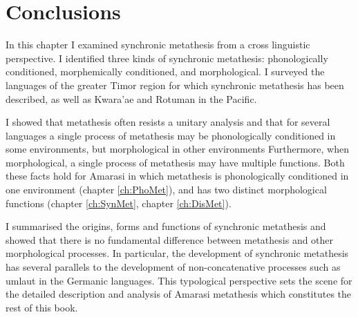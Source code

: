\section{Conclusions}\label{sec:MorMetCon}
In this chapter I examined synchronic metathesis from
a cross linguistic perspective.
I identified three kinds of synchronic metathesis:
phonologically conditioned, morphemically conditioned, and morphological.
I surveyed the languages of the greater Timor region
for which synchronic metathesis has been described,
as well as Kwara'ae and Rotuman in the Pacific.

I showed that metathesis often resists a unitary analysis
and that for several languages a single process of metathesis may be phonologically conditioned
in some environments, but morphological in other environments
Furthermore, when morphological, a single process of metathesis may have multiple functions.
Both these facts hold for Amarasi in which metathesis is
phonologically conditioned in one environment (chapter \ref{ch:PhoMet}),
and has two distinct morphological functions (chapter \ref{ch:SynMet}, chapter \ref{ch:DisMet}).

I summarised the origins, forms and functions of synchronic metathesis
and showed that there is no fundamental difference between metathesis
and other morphological processes.
In particular, the development of synchronic metathesis has
several parallels to the development of non-concatenative
processes such as umlaut in the Germanic languages.
This typological perspective sets the scene for the detailed description
and analysis of Amarasi metathesis which constitutes the rest of this book.
	